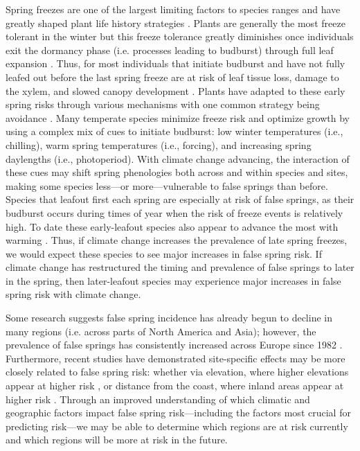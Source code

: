 \documentclass{article}\usepackage[]{graphicx}\usepackage[]{color}
\begin{document}
Spring freezes are one of the largest limiting factors to species ranges and have greatly shaped plant life history strategies \citep{Kollas2014}. Plants are generally the most freeze tolerant in the winter but this freeze tolerance greatly diminishes once individuals exit the dormancy phase (i.e. processes leading to budburst) through full leaf expansion \citep{Vitasse2014,Lenz2016}. Thus, for most individuals that initiate budburst and have not fully leafed out before the last spring freeze are at risk of leaf tissue loss, damage to the xylem, and slowed canopy development \citep{Gu2008,Hufkens2012}. Plants have adapted to these early spring risks through various mechanisms with one common strategy being avoidance \citep{Vitasse2014}. Many temperate species minimize freeze risk and optimize growth by using a complex mix of cues to initiate budburst: low winter temperatures (i.e., chilling), warm spring temperatures (i.e., forcing), and increasing spring daylengths (i.e., photoperiod). With climate change advancing, the interaction of these cues may shift spring phenologies both across and within species and sites, making some species less---or more---vulnerable to false springs than before. Species that leafout first each spring are especially at risk of false springs, as their budburst occurs during times of year when the risk of freeze events is relatively high. To date these early-leafout species also appear to advance the most with warming  \citep{Wolkovich2012}. Thus, if climate change increases the prevalence of late spring freezes, we would expect these species to see major increases in false spring risk. If climate change has restructured the timing and prevalence of false springs to later in the spring, then later-leafout species may experience major increases in false spring risk with climate change. 

Some research suggests false spring incidence has already begun to decline in many regions (i.e. across parts of North America and Asia); however, the prevalence of false springs has consistently increased across Europe since 1982 \citep{Liu2018}. Furthermore, recent studies have demonstrated site-specific effects may be more closely related to false spring risk: whether via elevation, where higher elevations appear at higher risk \citep{ Vitra2017,Ma2018, Vitasse2018}, or distance from the coast, where inland areas appear at higher risk \citep{Wypych2016a,Ma2018}. Through an improved understanding of which climatic and geographic factors impact false spring risk---including the factors most crucial for predicting risk---we may be able to determine which regions are at risk currently and which regions will be more at risk in the future.
\end{document}
